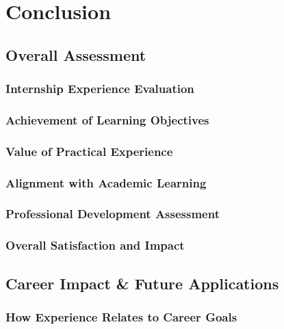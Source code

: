 
\chapter{Conclusion}

\section{Overall Assessment}

\subsection{Internship Experience Evaluation}

\subsection{Achievement of Learning Objectives}

\subsection{Value of Practical Experience}

\subsection{Alignment with Academic Learning}

\subsection{Professional Development Assessment}

\subsection{Overall Satisfaction and Impact}

\section{Career Impact \& Future Applications}

\subsection{How Experience Relates to Career Goals}

